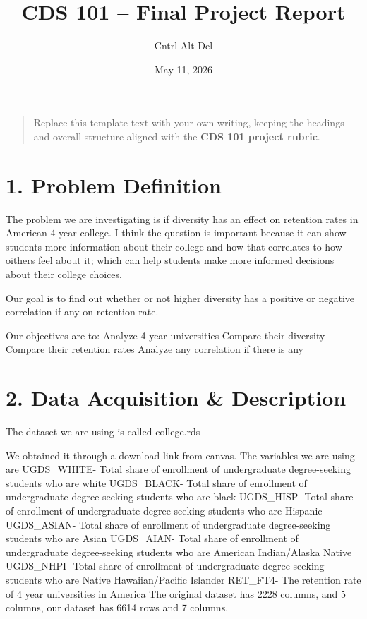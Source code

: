 \documentclass[
]{article}
\title{CDS 101 -- Final Project Report}
\author{Cntrl Alt Del}
\date{May 11, 2026}
\begin{document}
\maketitle

{
\setcounter{tocdepth}{2}
\tableofcontents
}
\begin{quote}
Replace this template text with your own writing, keeping the headings
and overall structure aligned with the \textbf{CDS 101 project rubric}.
\end{quote}

\section{1. Problem Definition}\label{problem-definition}

The problem we are investigating is if diversity has an effect on
retention rates in American 4 year college. I think the question is
important because it can show students more information about their
college and how that correlates to how oithers feel about it; which can
help students make more informed decisions about their college choices.

Our goal is to find out whether or not higher diversity has a positive
or negative correlation if any on retention rate.

Our objectives are to: Analyze 4 year universities Compare their
diversity Compare their retention rates Analyze any correlation if there
is any

\section{2. Data Acquisition \&
Description}\label{data-acquisition-description}

The dataset we are using is called college.rds

We obtained it through a download link from canvas. The variables we are
using are UGDS\_WHITE- Total share of enrollment of undergraduate
degree-seeking students who are white UGDS\_BLACK- Total share of
enrollment of undergraduate degree-seeking students who are black
UGDS\_HISP- Total share of enrollment of undergraduate degree-seeking
students who are Hispanic UGDS\_ASIAN- Total share of enrollment of
undergraduate degree-seeking students who are Asian UGDS\_AIAN- Total
share of enrollment of undergraduate degree-seeking students who are
American Indian/Alaska Native UGDS\_NHPI- Total share of enrollment of
undergraduate degree-seeking students who are Native Hawaiian/Pacific
Islander RET\_FT4- The retention rate of 4 year universities in America
The original dataset has 2228 columns, and 5 columns, our dataset has
6614 rows and 7 columns.
\end{document}
